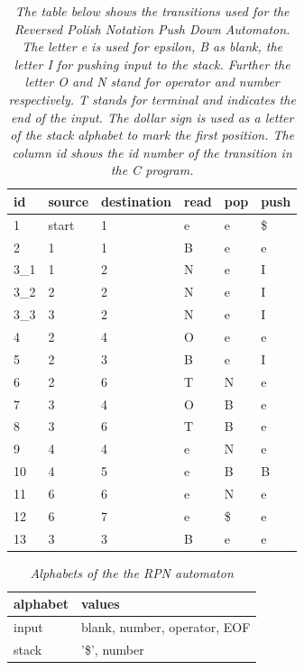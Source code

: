 \documentclass[a4paper,11pt,twoside]{article}
\begin{document}
\begin{table}[]
\centering
\caption{\textit{The table below shows the transitions used for the Reversed
  Polish Notation Push Down Automaton. The letter \textit{e} is used
  for \textit{epsilon}, \textit{B} as \textit{blank}, the letter
  \textit{I} for pushing \textit{input} to the stack. Further the
  letter \textit{O} and \textit{N} stand for \textit{operator} and
  \textit{number} respectively. \textit{T} stands for \textit{terminal} 
  and indicates the end of the input. The dollar sign is used as a
  letter of the stack alphabet to mark the first position. The column
  \textit{id} shows the id number of the transition in the C program.}}
\label{tab:trans}
\begin{tabular}{llllll}
id  & source & destination & read & pop & push \\ \hline
1   & start  & 1           & e    & e   & \$    \\
2   & 1      & 1           & B    & e   & e    \\
3\_1 & 1      & 2           & N    & e   & I    \\
3\_2 & 2      & 2           & N    & e   & I    \\
3\_3 & 3      & 2           & N    & e   & I    \\
4   & 2      & 4           & O    & e   & e    \\
5   & 2      & 3           & B    & e   & I    \\
6   & 2      & 6           & T    & N   & e    \\
7   & 3      & 4           & O    & B   & e    \\
8   & 3      & 6           & T    & B   & e    \\
9   & 4      & 4           & e    & N   & e    \\
10  & 4      & 5           & e    & B   & B    \\
11  & 6      & 6           & e    & N   & e    \\
12  & 6      & 7           & e    & \$   & e   \\
13  & 3      & 3           & B    & e   & e    \\
\end{tabular}
\end{table}

\begin{table}[]
\centering
\caption{\textit{Alphabets of the the RPN automaton}}
\label{tab:alphabets}
\begin{tabular}{ll}
alphabet & values                                   \\ \hline
input    & blank, number, operator, EOF \\
stack    & '\$', number                
\end{tabular}
\end{table}
\end{document}
